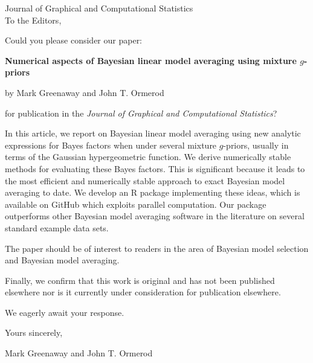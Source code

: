 \documentclass[11pt]{article}
\begin{document}
\rightline{\today}

\noindent Journal of Graphical and Computational Statistics \\



 
 

\vskip5mm \noindent To the Editors,

\vskip5mm \noindent Could you please consider our paper:
\vskip5mm
\centerline{\bf Numerical aspects of Bayesian linear model averaging using mixture $g$-priors}
\medskip 
 
\vskip5mm
\centerline{\sf by Mark Greenaway and John T. Ormerod}

\vskip5mm \noindent for publication in the {\it Journal of Graphical and Computational Statistics}?



\medskip 
In this article, we report on Bayesian linear model averaging using new analytic expressions for Bayes factors when under several mixture $g$-priors, usually in terms of the Gaussian hypergeometric function.
We derive numerically stable methods for evaluating these Bayes factors.
This is significant because it leads to the most efficient
and numerically stable approach to exact Bayesian model averaging
to date. We develop an R package implementing these ideas,
which is available on GitHub which exploits parallel computation.
Our package outperforms other Bayesian model averaging software
in the literature on several standard example data sets. 



\medskip 
The paper should be of interest to readers in the area of Bayesian model selection
and Bayesian model averaging.


\medskip 
Finally, we confirm that this work is original and has not been published elsewhere nor is it currently under
consideration for publication elsewhere.


\vskip5mm \noindent We eagerly await your response.

\vskip5mm \noindent Yours sincerely,

\vskip5mm \noindent Mark Greenaway and John T. Ormerod
\end{document}
